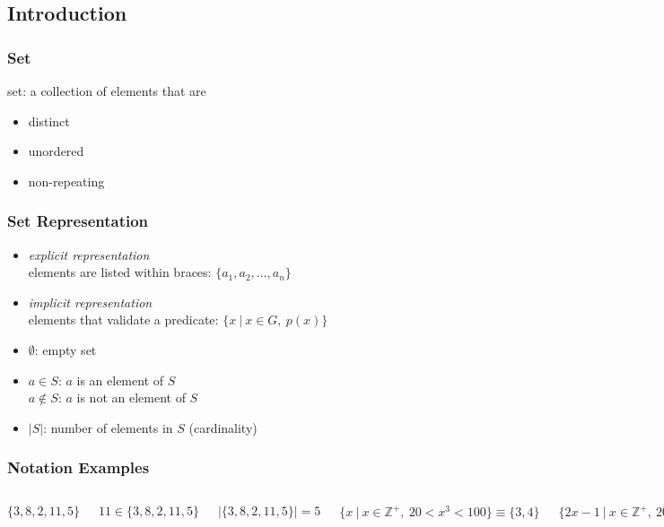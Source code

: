 \documentclass[dvipsnames]{beamer}
\begin{document}
\subsection{Introduction}

\begin{frame}
  \frametitle{Set}

  \begin{definition}
    \alert{set}: a collection of elements that are
    \begin{itemize}
      \item distinct
      \item unordered
      \item non-repeating
    \end{itemize}
  \end{definition}
\end{frame}

\begin{frame}
  \frametitle{Set Representation}

  \begin{itemize}
    \item \emph{explicit representation}\\
      elements are listed within braces: $\{a_1, a_2, \dots, a_n\}$

    \pause
    \medskip
    \item \emph{implicit representation}\\
      elements that validate a predicate: $\{x~|~x \in G,~p(x)\}$

    \pause
    \medskip
    \item $\emptyset$: empty set

    \pause
    \medskip
    \item $a \in S$: $a$ is an element of $S$\\
      $a \notin S$: $a$ is not an element of $S$

    \pause
    \medskip
    \item $|S|$: number of elements in $S$ (\alert{cardinality})
  \end{itemize}
\end{frame}

\begin{frame}
  \frametitle{Notation Examples}

  \begin{columns}[t]
    $\{3,8,2,11,5\}$

    \medskip
    $11 \in \{3,8,2,11,5\}$

    \medskip
    $|\{3,8,2,11,5\}|=5$

    \pause
    $\{x~|~x \in \mathbb{Z}^+,~20 < x^3 < 100\} \equiv \{3,4\}$

    \medskip
    $\{2x-1~|~x \in \mathbb{Z}^+,~20 < x^3 < 100\} \equiv \{5,7\}$

    \pause
    \medskip
    $\{n~|~n \in \mathbb{N},~\exists k \in \mathbb{N}~[n=2k]\}$\\
  \end{columns}
\end{frame}
\end{document}

